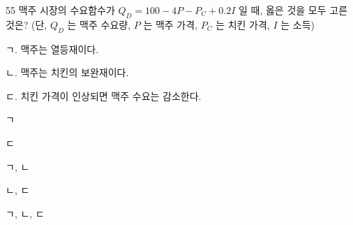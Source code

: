 \begin{question}{55}
맥주 시장의 수요함수가 $Q_{D}=100-4P-P_{C}+0.2I$ 일 때, 옳은 것을 모두 고른 것은? (단, $Q_{D}$ 는 맥주 수요량, $P$ 는 맥주 가격, $P_{C}$ 는 치킨 가격, $I$ 는 소득)
\begin{framedtext}
ㄱ. 맥주는 열등재이다. \par
ㄴ. 맥주는 치킨의 보완재이다. \par
ㄷ. 치킨 가격이 인상되면 맥주 수요는 감소한다. \par
\end{framedtext}
\begin{choices}
  \item ㄱ
  \item ㄷ
  \item ㄱ, ㄴ
  \item ㄴ, ㄷ
  \item ㄱ, ㄴ, ㄷ
\end{choices}
\end{question}
